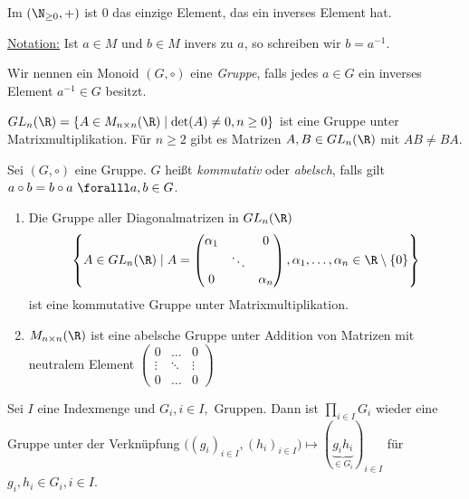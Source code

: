 \begin{exmp*}
	Im $ (\N_{\geq 0},+) $ ist 0 das einzige Element, das ein inverses Element hat.
\end{exmp*}

\underline{Notation:} Ist $ a \in M $ und $ b \in M $ invers zu $a$, so schreiben wir $ b = a^{-1} $.

\begin{defn*}[Gruppe]
	Wir nennen ein Monoid $ (G,\circ) $ eine \emph{Gruppe}, falls jedes $ a \in G $ ein inverses Element $ a^{-1} \in G $ besitzt.
\end{defn*}

\begin{exmp*}
	$ GL_n(\R) = \{A \in M_{n \times n} (\R) \mid \det(A) \neq 0, n \geq 0\} $ ist eine Gruppe unter Matrixmultiplikation. Für $ n \geq 2 $ gibt es Matrizen $ A,B \in GL_n(\R) $ mit $ AB \neq BA $.
\end{exmp*}

\begin{defn*}
	Sei $ (G,\circ) $ eine Gruppe. $G$ heißt \emph{kommutativ} oder \emph{abelsch}, falls gilt $ a \circ b = b \circ a \ \foralll a,b \in G $.
\end{defn*}

\begin{exmp*}
	\begin{enumerate}[label=\textcircled{\alph*}]
		\item Die Gruppe aller Diagonalmatrizen in $ GL_n(\R) $ 
			$$ \left\{A \in GL_n(\R) \mid A = \begin{pmatrix}
				\alpha_1 & & 0 \\ & \ddots & \\ 0 & & \alpha_n
			\end{pmatrix}, \alpha_1, \dotsc, \alpha_n \in \R \setminus\{0\} \right\} $$
			ist eine kommutative Gruppe unter Matrixmultiplikation.
		\item $ M_{n \times n}(\R) $ ist eine abelsche Gruppe unter Addition von Matrizen mit neutralem Element $ \begin{pmatrix}
			0 & \dots & 0 \\ \vdots & \ddots & \vdots \\ 0 & \dots & 0
		\end{pmatrix} $
	\end{enumerate}
\end{exmp*}

\begin{rem*}
	Sei $ I $ eine Indexmenge und $ G_i, i \in I, $ Gruppen. Dann ist $ \prod_{i \in I} G_i $ wieder eine Gruppe unter der Verknüpfung $ \big((g_i)_{i \in I}, (h_i)_{i \in I}\big) \mapsto (\underbrace{g_i h_i}_{\in G_i})_{i \in I} $ für $ g_i,h_i \in G_i, i \in I $.
\end{rem*}

